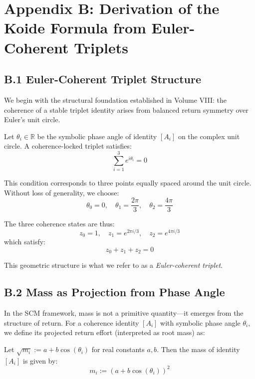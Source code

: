 
\appendix
\section*{Appendix B: Derivation of the Koide Formula from Euler-Coherent Triplets} \label{appendix:koide-proof}

\subsection*{B.1 Euler-Coherent Triplet Structure}

We begin with the structural foundation established in Volume VIII: the coherence of a stable triplet identity arises from balanced return symmetry over Euler's unit circle.

\begin{postulate}
Let $\theta_i \in \mathbb{R}$ be the symbolic phase angle of identity $[A_i]$ on the complex unit circle. A coherence-locked triplet satisfies:
\[
\sum_{i=1}^3 e^{i\theta_i} = 0
\]
\end{postulate}

This condition corresponds to three points equally spaced around the unit circle. Without loss of generality, we choose:
\[
\theta_0 = 0,\quad \theta_1 = \frac{2\pi}{3},\quad \theta_2 = \frac{4\pi}{3}
\]

The three coherence states are thus:
\[
z_0 = 1,\quad z_1 = e^{2\pi i / 3},\quad z_2 = e^{4\pi i / 3}
\]
which satisfy:
\[
z_0 + z_1 + z_2 = 0
\]

This geometric structure is what we refer to as a \textit{Euler-coherent triplet}.

\subsection*{B.2 Mass as Projection from Phase Angle}

In the SCM framework, mass is not a primitive quantity—it emerges from the structure of return. For a coherence identity $[A_i]$ with symbolic phase angle $\theta_i$, we define its projected return effort (interpreted as root mass) as:

\begin{definition}
Let $\sqrt{m_i} := a + b \cos(\theta_i)$ for real constants $a, b$. Then the mass of identity $[A_i]$ is given by:
\[
m_i := (a + b \cos(\theta_i))^2
\]
\end{definition}


